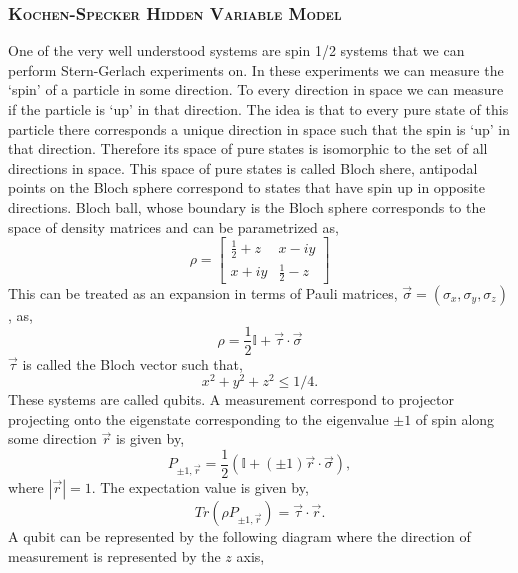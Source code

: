 \documentclass[11pt]{report}
\begin{document}
\subsubsection*{\textsc{Kochen-Specker Hidden Variable Model}}
One of the very well understood systems are spin 1/2 systems that we can perform Stern-Gerlach experiments on. In these experiments we can measure the `spin' of a particle in some direction. To every direction in space we can measure if the particle is `up' in that direction. The idea is that to every pure state of this particle there corresponds a unique direction in space such that the spin is `up' in that direction. Therefore its space of pure states is isomorphic to the set of all directions in space. This space of pure states is called Bloch shere, antipodal points on the Bloch sphere correspond to states that have spin up in opposite directions. Bloch ball, whose boundary is the Bloch sphere corresponds to the space of density matrices and can be parametrized as,
$$\rho=\left[
\begin{matrix}
	\frac{1}{2}+z & x-iy \\
	x+iy & \frac{1}{2}-z 
\end{matrix}
\right]$$
This can be treated as an expansion in terms of Pauli matrices, $\vec{\sigma}=(\sigma_x,\sigma_y,\sigma_z)$, as,
$$\rho=\frac{1}{2}\mathbb{I}+\vec\tau\cdot \vec{\sigma}$$
$\vec{\tau}$ is called the Bloch vector such that,
$$x^2+y^2+z^2\leq 1/4.$$
These systems are called qubits. A measurement correspond to projector projecting onto the eigenstate corresponding to the eigenvalue $\pm 1$ of spin along some direction $\vec{r}$ is given by,
$$P_{\pm 1, \vec{r}}=\frac{1}{2}(\mathbb{I}+ (\pm 1) \vec{r}\cdot \vec{\sigma}),$$
where $|\vec{r}|=1$. The expectation value is given by,
$$Tr(\rho P_{\pm 1, \vec{r}})=\vec{\tau}\cdot \vec{r}.$$	
A qubit can be represented by the following diagram where the direction of measurement is represented by the $z$ axis,
\end{document}
